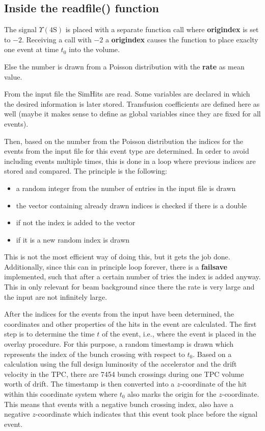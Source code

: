 \subsection*{Inside the readfile() function}
The signal $\Upsilon (4\text{S})$ is placed with a separate function call where \textbf{origindex} is set to $-2$. Receiving a call with $-2$ a \textbf{origindex} causes the function to place exaclty one event at time $t_0$ into the volume.

Else the number is drawn from a Poisson distribution with the \textbf{rate} as mean value.

From the input file the SimHits are read. Some variables are declared in which the desired information is later stored. Transfusion coefficients are defined here as well (maybe it makes sense to define as global variables since they are fixed for all events).

Then, based on the number from the Poisson distribution the indices for the events from the input file for this event type are determined. In order to avoid including events multiple times, this is done in a loop where previous indices are stored and compared. The principle is the following:
\begin{itemize}
	\item a random integer from the number of entries in the input file is drawn
	\item the vector containing already drawn indices is checked if there is a double
	\item if not the index is added to the vector
	\item if it is a new random index is drawn
\end{itemize}
This is not the most efficient way of doing this, but it gets the job done. Additionally, since this can in principle loop forever, there is a \textbf{failsave} implemented, such that after a certain number of tries the index is added anyway. This in only relevant for beam background since there the rate is very large and the input are not infinitely large. 

After the indices for the events from the input have been determined, the coordinates and other properties of the hits in the event are calculated. The first step is to determine the time $t$ of the event, i.e., where the event is placed in the overlay procedure. For this purpose, a random timestamp is drawn which represents the index of the bunch crossing with respect to $t_0$. Based on a calculation using the full design luminosity of the accelerator and the drift velocity in the TPC, there are 7454 bunch crossings during one TPC volume worth of drift. The timestamp is then converted into a $z$-coordinate of the hit within this coordinate system where $t_0$ also marks the origin for the $z$-coordinate. This means that events with a negative bunch crossing index, also have a negative $z$-coordinate which indicates that this event took place before the signal event. 

